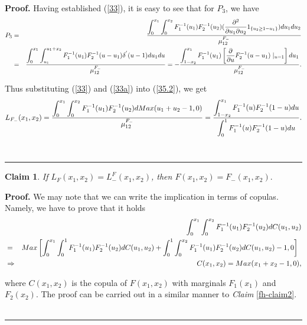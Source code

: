 \documentclass[onecolumn]{article}
\providecommand{\dint}{\displaystyle\int}
\newtheorem{claim}[theorem]{Claim}
\newenvironment{proof}[1][Proof]{\noindent\textbf{#1.} }{\ \rule{0.5em}{0.5em}}
\renewcommand{\dint}{\displaystyle\int}
\begin{document}
\begin{proof}
Having established (\ref{33}), it is easy to see that for $P_{3}$, we have%
\begin{eqnarray}
P_{3} &=&\frac{\dint\nolimits_{0}^{x_{1}}\dint%
\nolimits_{0}^{x_{2}}F_{1}^{-1}(u_{1})F_{2}^{-1}(u_{2})(\frac{\partial ^{2}}{%
\partial u_{1}\partial u_{2}}1_{\left\{ u_{2}\geq 1-u_{1}\right\}
})du_{1}du_{2}}{\mu _{12}^{F_{-}}}  \notag \\
&=&\frac{\dint\nolimits_{0}^{x_{1}}\dint%
\nolimits_{u_{1}}^{u_{1}+x_{2}}F_{1}^{-1}(u_{1})F_{2}^{-1}(u-u_{1})\delta
^{^{\prime }}(u-1)du_{1}du}{\mu _{12}^{F_{-}}}=-\frac{\dint%
\nolimits_{1-x_{2}}^{x_{1}}F_{1}^{-1}(u_{1})\left[ \frac{\partial }{\partial
u}F_{2}^{-1}(u-u_{1})\mid _{u=1}\right] du_{1}}{\mu _{12}^{F_{-}}}.
\label{33a}
\end{eqnarray}

Thus substituting (\ref{33}) and (\ref{33a}) into (\ref{35.2}), we get%
\begin{equation}
L_{F_{-}}(x_{1},x_{2})=\frac{\dint\nolimits_{0}^{x_{1}}\dint%
\nolimits_{0}^{x_{2}}F_{1}^{-1}(u_{1})F_{2}^{-1}(u_{2})dMax(u_{1}+u_{2}-1,0)%
}{\mu _{12}^{F_{-}}}=\frac{\dint%
\nolimits_{1-x_{2}}^{x_{1}}F_{1}^{-1}(u)F_{2}^{-1}(1-u)du}{%
\dint\nolimits_{0}^{1}F_{1}^{-1}(u)F_{2}^{-1}(1-u)du}.  \label{35.3}
\end{equation}
\end{proof}

\begin{claim}
\label{fh-claim4} If $L_{F}(x_{1},x_{2})=L_{-}^{F}(x_{1},x_{2})$, then $%
F(x_{1},x_{2})=F_{-}(x_{1},x_{2}).$
\end{claim}

\begin{proof}
We may note that we can write the implication in terms of copulas. Namely,
we have to prove that it holds%
\begin{eqnarray}
&&\dint\nolimits_{0}^{x_{1}}\dint%
\nolimits_{0}^{x_{2}}F_{1}^{-1}(u_{1})F_{2}^{-1}(u_{2})dC(u_{1},u_{2})
\label{35b} \\
&=&Max\left[ \dint\nolimits_{0}^{x_{1}}\dint%
\nolimits_{0}^{1}F_{1}^{-1}(u_{1})F_{2}^{-1}(u_{2})dC(u_{1},u_{2})+\dint%
\nolimits_{0}^{1}\dint%
\nolimits_{0}^{x_{2}}F_{1}^{-1}(u_{1})F_{2}^{-1}(u_{2})dC(u_{1},u_{2})-1,0%
\right] \text{ }  \notag \\
&\Rightarrow &C(x_{1},x_{2})=Max(x_{1}+x_{2}-1,0),  \label{35bb}
\end{eqnarray}

where $C(x_{1},x_{2})$ is the copula of $F(x_{1},x_{2})$ with marginals $%
F_{1}(x_{1})$ and $F_{2}(x_{2})$. The proof can be carried out in a similar
manner to \textit{Claim }{\footnotesize \ref{fh-claim2}}.
\end{proof}
\end{document}
